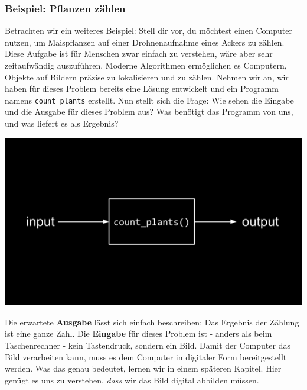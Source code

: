 \documentclass[
  ngerman,
  letterpaper,
  DIV=11]{scrreprt}
\begin{document}
\subsubsection{Beispiel: Pflanzen
zählen}\label{beispiel-pflanzen-zuxe4hlen}

Betrachten wir ein weiteres Beispiel: Stell dir vor, du möchtest einen
Computer nutzen, um Maispflanzen auf einer Drohnenaufnahme eines Ackers
zu zählen. Diese Aufgabe ist für Menschen zwar einfach zu verstehen,
wäre aber sehr zeitaufwändig auszuführen. Moderne Algorithmen
ermöglichen es Computern, Objekte auf Bildern präzise zu lokalisieren
und zu zählen. Nehmen wir an, wir haben für dieses Problem bereits eine
Lösung entwickelt und ein Programm namens \texttt{count\_plants}
erstellt. Nun stellt sich die Frage: Wie sehen die Eingabe und die
Ausgabe für dieses Problem aus? Was benötigt das Programm von uns, und
was liefert es als Ergebnis?

\begin{center}
\includegraphics[width=1\linewidth,height=\textheight,keepaspectratio]{problem-solving_files/mediabag/problem_solving_exam1.png}
\end{center}

Die erwartete \textbf{Ausgabe} lässt sich einfach beschreiben: Das
Ergebnis der Zählung ist eine ganze Zahl. Die \textbf{Eingabe} für
dieses Problem ist - anders als beim Taschenrechner - kein Tastendruck,
sondern ein Bild. Damit der Computer das Bild verarbeiten kann, muss es
dem Computer in digitaler Form bereitgestellt werden. Was das genau
bedeutet, lernen wir in einem späteren Kapitel. Hier genügt es uns zu
verstehen, \emph{dass }wir das Bild digital abbilden müssen.
\end{document}
